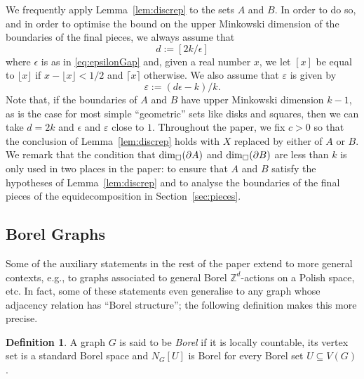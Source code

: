\documentclass[12pt,a4paper]{amsart}
\numberwithin{equation}{section}
\theoremstyle{definition}
\newtheorem{defn}[equation]{Definition}
\begin{document}
We frequently apply Lemma~\ref{lem:discrep} to the sets $A$ and $B$. In order to do so, and in order to optimise the bound on the upper Minkowski dimension of the boundaries of the final pieces, we always assume that
\begin{equation}
\label{eq:dBound}
d:= \left[ 2k/\epsilon\right]
\end{equation}
where $\epsilon$ is as in \eqref{eq:epsilonGap} and, given a real number $x$, we let $[x]$ be equal to $\lfloor x\rfloor$ if $x-\lfloor x\rfloor <1/2$ and $\lceil x\rceil$ otherwise. We also assume that $\varepsilon$ is given by
\begin{equation}
\label{eq:epsBound}
\varepsilon:= (d\epsilon -k)/k.
\end{equation}
Note that, if the boundaries of $A$ and $B$ have upper Minkowski dimension $k-1$, as is the case for most simple ``geometric'' sets like disks and squares, then we can take $d=2k$ and $\epsilon$ and $\varepsilon$ close to $1$. Throughout the paper, we fix $c>0$ so that the conclusion of Lemma~\ref{lem:discrep} holds with $X$ replaced by either of $A$ or $B$. We remark that the condition that $\operatorname{dim}_\square(\partial A)$ and $\operatorname{dim}_\square(\partial B)$ are less than $k$ is only used in two places in the paper: to ensure that $A$ and $B$ satisfy the hypotheses of Lemma~\ref{lem:discrep} and to analyse the boundaries of the final pieces of the equidecomposition in Section~\ref{sec:pieces}.

\subsection{Borel Graphs}

Some of the auxiliary statements in the rest of the paper extend to more general contexts, e.g., to graphs associated to general Borel $\mathbb{Z}^d$-actions on a Polish space, etc. In fact, some of these statements even generalise to any graph whose adjacency relation has ``Borel structure''; the following definition makes this more precise.

\begin{defn}
A graph $G$ is said to be \emph{Borel} if it is locally countable, its vertex set is a standard Borel space and $N_G[U]$ is Borel for every Borel set $U\subseteq V(G)$. 
\end{defn}
\end{document}
